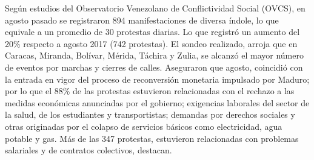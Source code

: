 \documentclass{article}%
\begin{document}
\newline%
%
Según estudios del Observatorio Venezolano de Conflictividad Social (OVCS), en agosto pasado se registraron 894 manifestaciones de diversa índole, lo que equivale a un promedio de 30 protestas diarias. Lo que registró un aumento del 20\% respecto a agosto 2017 (742 protestas).%
\newline%
%
El sondeo realizado, arroja que  en Caracas, Miranda, Bolívar, Mérida, Táchira y Zulia,  se alcanzó el mayor número de eventos por marchas y cierres de calles.%
\newline%
%
Aseguraron que agosto, coincidió con la entrada en vigor del proceso de reconversión monetaria impulsado por Maduro; por lo que el 88\% de las protestas estuvieron relacionadas con el rechazo a las medidas económicas anunciadas por el gobierno; exigencias laborales del sector de la salud, de los estudiantes y transportistas; demandas por derechos sociales y otras originadas por el colapso de servicios básicos como electricidad, agua potable y gas.%
\newline%
%
Más de las 347 protestas,  estuvieron relacionadas con problemas salariales y de contratos colectivos, destacan.%
\newline%
%
\end{document}
